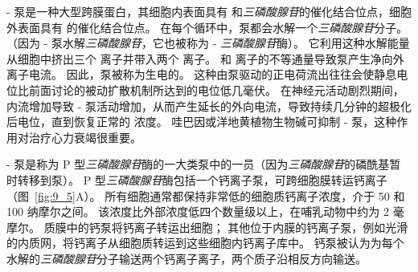 - 泵是一种大型跨膜蛋白，其细胞内表面具有  和\textit{三磷酸腺苷}的催化结合位点，细胞外表面具有  的催化结合位点。
在每个循环中，泵都会水解一个\textit{三磷酸腺苷}分子。
（因为 - 泵水解\textit{三磷酸腺苷}，它也被称为 - \textit{三磷酸腺苷}酶）。
它利用这种水解能量从细胞中挤出三个  离子并带入两个  离子。
 和  离子的不等通量导致泵产生净向外离子电流。
因此，泵被称为生电的。
这种由泵驱动的正电荷流出往往会使静息电位比前面讨论的被动扩散机制所达到的电位低几毫伏。
在神经元活动剧烈期间， 内流增加导致 - 泵活动增加，从而产生延长的外向电流，导致持续几分钟的超极化后电位，直到恢复正常的  浓度。
哇巴因或洋地黄植物生物碱可抑制 - 泵，这种作用对治疗心力衰竭很重要。


- 泵是称为 P 型\textit{三磷酸腺苷}酶的一大类泵中的一员（因为\textit{三磷酸腺苷}的磷酰基暂时转移到泵）。
P 型\textit{三磷酸腺苷}酶包括一个钙离子泵，可跨细胞膜转运钙离子（图~\ref{fig:9_5}A）。
所有细胞通常都保持非常低的细胞质钙离子浓度，介于 50 和 100 纳摩尔之间。
该浓度比外部浓度低四个数量级以上，在哺乳动物中约为 2 毫摩尔。
质膜中的钙泵将钙离子转运出细胞；
其他位于内膜的钙离子泵，例如光滑的内质网，将钙离子从细胞质转运到这些细胞内钙离子库中。
钙泵被认为为每个水解的\textit{三磷酸腺苷}分子输送两个钙离子离子，两个质子沿相反方向输送。



